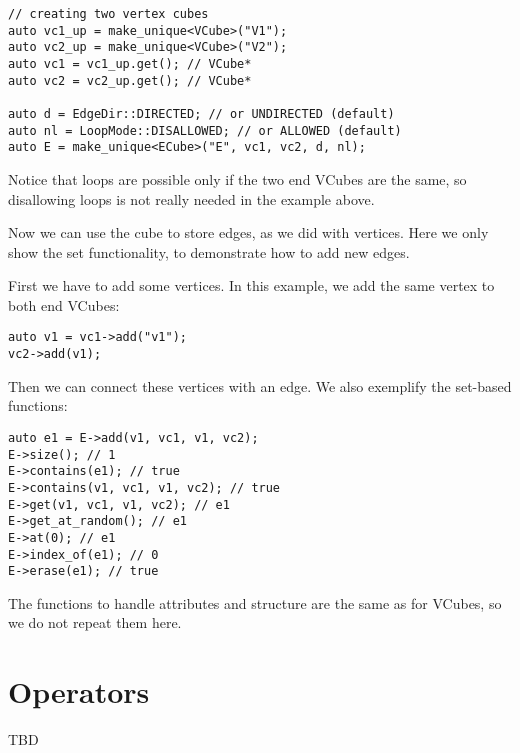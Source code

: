 \begin{lstlisting}[style=c++]
// creating two vertex cubes
auto vc1_up = make_unique<VCube>("V1");
auto vc2_up = make_unique<VCube>("V2");
auto vc1 = vc1_up.get(); // VCube*
auto vc2 = vc2_up.get(); // VCube*

auto d = EdgeDir::DIRECTED; // or UNDIRECTED (default)
auto nl = LoopMode::DISALLOWED; // or ALLOWED (default)
auto E = make_unique<ECube>("E", vc1, vc2, d, nl);
\end{lstlisting}
Notice that loops are possible only if the two end VCubes are the same, so disallowing loops is not really needed in the example above.

Now we can use the cube to store edges, as we did with vertices. Here we only show the set functionality, to demonstrate how to add new edges. 

First we have to add some vertices. In this example, we add the same vertex to both end VCubes:
\begin{lstlisting}[style=c++]
auto v1 = vc1->add("v1");
vc2->add(v1);
\end{lstlisting}
Then we can connect these vertices with an edge. We also exemplify the set-based functions:
\begin{lstlisting}[style=c++]
auto e1 = E->add(v1, vc1, v1, vc2);
E->size(); // 1
E->contains(e1); // true
E->contains(v1, vc1, v1, vc2); // true
E->get(v1, vc1, v1, vc2); // e1
E->get_at_random(); // e1
E->at(0); // e1
E->index_of(e1); // 0
E->erase(e1); // true
\end{lstlisting}
The functions to handle attributes and structure are the same as for VCubes, so we do not repeat them here.

\section{Operators}

TBD


